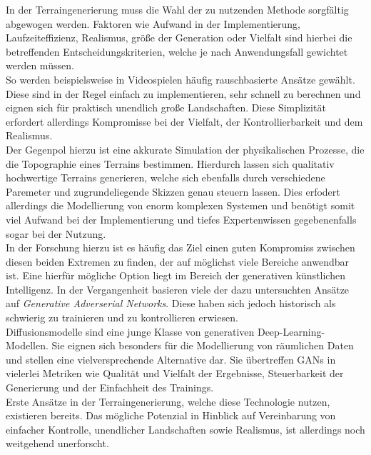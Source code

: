 In der Terraingenerierung muss die Wahl der zu nutzenden Methode sorgfältig abgewogen werden. Faktoren wie Aufwand in der Implementierung, Laufzeiteffizienz, Realismus, größe der Generation oder Vielfalt sind hierbei die betreffenden Entscheidungskriterien, welche je nach Anwendungsfall gewichtet werden müssen. \\
So werden beispielsweise in Videospielen häufig rauschbasierte Ansätze gewählt. Diese sind in der Regel einfach zu implementieren, sehr schnell zu berechnen und eignen sich für praktisch unendlich große Landschaften. Diese Simplizität erfordert allerdings Kompromisse bei der Vielfalt, der Kontrollierbarkeit und dem Realismus. \\
Der Gegenpol hierzu ist eine akkurate Simulation der physikalischen Prozesse, die die Topographie eines Terrains bestimmen. Hierdurch lassen sich qualitativ hochwertige Terrains generieren, welche sich ebenfalls durch verschiedene Paremeter und zugrundeliegende Skizzen genau steuern lassen. Dies erfodert allerdings die Modellierung von enorm komplexen Systemen und benötigt somit viel Aufwand bei der Implementierung und tiefes Expertenwissen gegebenenfalls sogar bei der Nutzung. \\
In der Forschung hierzu ist es häufig das Ziel einen guten Kompromiss zwischen diesen beiden Extremen zu finden, der auf möglichst viele Bereiche anwendbar ist. Eine hierfür mögliche Option liegt im Bereich der generativen künstlichen Intelligenz. In der Vergangenheit basieren viele der dazu untersuchten Ansätze auf \textit{Generative Adverserial Networks}. Diese haben sich jedoch historisch als schwierig zu trainieren und zu kontrollieren erwiesen. \\
Diffusionsmodelle sind eine junge Klasse von generativen Deep-Learning-Modellen. Sie eignen sich besonders für die Modellierung von räumlichen Daten und stellen eine vielversprechende Alternative dar. Sie übertreffen GANs in vielerlei Metriken wie Qualität und Vielfalt der Ergebnisse, Steuerbarkeit der Generierung und der Einfachheit des Trainings. \\
Erste Ansätze in der Terraingenerierung, welche diese Technologie nutzen, existieren bereits. Das mögliche Potenzial in Hinblick auf Vereinbarung von einfacher Kontrolle, unendlicher Landschaften sowie Realismus, ist allerdings noch weitgehend unerforscht.

